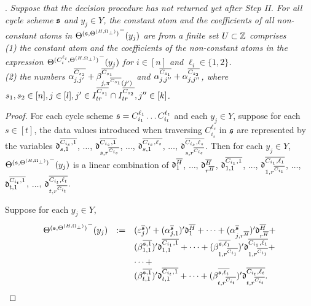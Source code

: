 \begin{appendix}
.
{\it 
Suppose that the decision procedure has not returned yet after Step II. 
For all cycle scheme ${\mathfrak{s} }$ and $y_j \in Y$, the constant atom and the coefficients of all non-constant atoms in ${\Theta^{({\mathfrak{s} }, \Theta^{(H,\Omega_\bot)})}}^-(y_j)$ are from a finite set $U \subset {\mathbb{Z} }$ comprises\\ (1)
the constant atom and the coefficients of the non-constant atoms in the expression ${\Theta^{(C^{\ell_i}_{i}, \Theta^{(H,\Omega_\bot)})}}^-(y_j)$ for $i\in [n]$ and $\ell_i \in \{1,2\}$.\smallskip\\(2) the numbers $\alpha^{\overline{C_{s_2}}}_{j,j'} + \beta^{\overline{C_{s_1}}}_{j,\pi^{\overline{C_{s_1}}}(j')}$ and $\alpha^{\overline{C_{s_1}}}_{j, j''} + \alpha^{\overline{C_{s_2}}}_{j,j''}$, where  $s_1,s_2 \in [n], j\in[l],j' \in I^{\overline{C_{s_1}}}_{tr} \cap I^{\overline{C_{s_2}}}_{tr},  j'' \in [k]$. 
}

\begin{proof}
For each cycle scheme ${\mathfrak{s} }=C^{\ell_1}_{i_1} \dots C^{\ell_t}_{i_t}$ and each $y_j \in Y$, suppose for each $s\in [t]$, the data values introduced when traversing $C_{i_s}^{\ell_s}$ in ${\mathfrak{s} }$ are represented by the variables $\mathfrak{d}^{\overline{C_{i_s} , 1}}_{s,1}$, $\dots$, $\mathfrak{d}^{\overline{C_{i_s} , 1}}_{s,r^{\overline{C_{i_s}}}}$, $\dots$, $\mathfrak{d}^{\overline{C_{i_s} , \ell_s}}_{s,1}$, $\dots$, $\mathfrak{d}^{\overline{C_{i_s} , \ell_s}}_{s,r^{\overline{C_{i_s}}}}$. Then for each $y_j \in Y$,
 ${\Theta^{({\mathfrak{s} },\Theta^{(H,\Omega_\bot)})}}^-(y_j)$ is a linear combination of $\mathfrak{d}^{\overline{H}}_1$, $\dots$, $\mathfrak{d}^{\overline{H}}_{r^{\overline{H}}}$, $\mathfrak{d}^{\overline{C_{i_1} , 1}}_{1,1}$, $\dots$, $\mathfrak{d}^{\overline{C_{i_1} , \ell_1}}_{1,r^{\overline{C_{i_1}}}}$, $\dots$, $\mathfrak{d}^{\overline{C_{i_t} , 1}}_{t,1}$, $\dots$, $\mathfrak{d}^{\overline{C_{i_t} , \ell_t}}_{t, r^{\overline{C_{i_t}}}}$. 

Suppose for each $y_j \in Y$,
\[
\begin{array}{l cl }
{\Theta^{({\mathfrak{s} },\Theta^{(H,\Omega_\bot)})}}^-(y_j) &:= & (\varepsilon^{\overline{{\mathfrak{s} }}}_{j})'  + (\alpha^{\overline{{\mathfrak{s} }}}_{j,1})' \mathfrak{d}^{\overline{H}}_1 + \dots + (\alpha^{\overline{{\mathfrak{s} }}}_{j,r^{\overline{H}}})' \mathfrak{d}^{\overline{H}}_{r^{\overline{H}}} + \\
& & (\beta^{\overline{{\mathfrak{s} },1}}_{1,1})' \mathfrak{d}^{\overline{C_{i_1},1}}_{1,1}  + \dots + (\beta^{\overline{{\mathfrak{s} },\ell_1}}_{1,r^{\overline{C_{i_1}}}})' \mathfrak{d}^{\overline{C_{i_1},\ell_1}}_{1,r^{\overline{C_{i_1}}}}  +  \\
& & \dots + \\
& & (\beta^{\overline{{\mathfrak{s} },1}}_{t,1})' \mathfrak{d}^{\overline{C_{i_{t}},1}}_{t,1} + \dots + (\beta^{\overline{{\mathfrak{s} },\ell_{t}}}_{t,r^{\overline{C_{i_{t}}}}})' \mathfrak{d}^{\overline{C_{i_{t}},\ell_{t}}}_{t, r^{\overline{C_{i_{t}}}}}.
\end{array}
\]


\end{proof}
\end{appendix}
